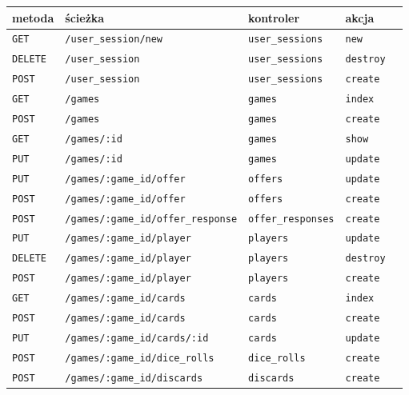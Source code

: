 \documentclass[a4paper,12pt]{article}
\begin{document}
\begin{table}[ht]
  \begin{tabular}{|l|l|l|l|l|}
    \hline
    \textbf{metoda} & \textbf{ścieżka} & \textbf{kontroler} & \textbf{akcja} \\ \hline
    \texttt{GET} & \texttt{/user\_session/new} & \texttt{user\_sessions} & \texttt{new} \\
    \texttt{DELETE} & \texttt{/user\_session} & \texttt{user\_sessions} & \texttt{destroy} \\
    \texttt{POST} & \texttt{/user\_session} & \texttt{user\_sessions} & \texttt{create} \\
    \texttt{GET} & \texttt{/games} & \texttt{games} & \texttt{index} \\
    \texttt{POST} & \texttt{/games} & \texttt{games} & \texttt{create} \\
    \texttt{GET} & \texttt{/games/:id} & \texttt{games} & \texttt{show} \\
    \texttt{PUT} & \texttt{/games/:id} & \texttt{games} & \texttt{update} \\
    \texttt{PUT} & \texttt{/games/:game\_id/offer} & \texttt{offers} & \texttt{update} \\
    \texttt{POST} & \texttt{/games/:game\_id/offer} & \texttt{offers} & \texttt{create} \\
    \texttt{POST} & \texttt{/games/:game\_id/offer\_response} & \texttt{offer\_responses} & \texttt{create} \\
    \texttt{PUT} & \texttt{/games/:game\_id/player} & \texttt{players} & \texttt{update} \\
    \texttt{DELETE} & \texttt{/games/:game\_id/player} & \texttt{players} & \texttt{destroy} \\
    \texttt{POST} & \texttt{/games/:game\_id/player} & \texttt{players} & \texttt{create} \\
    \texttt{GET} & \texttt{/games/:game\_id/cards} & \texttt{cards} & \texttt{index} \\
    \texttt{POST} & \texttt{/games/:game\_id/cards} & \texttt{cards} & \texttt{create} \\
    \texttt{PUT} & \texttt{/games/:game\_id/cards/:id} & \texttt{cards} & \texttt{update} \\
    \texttt{POST} & \texttt{/games/:game\_id/dice\_rolls} & \texttt{dice\_rolls} & \texttt{create} \\
    \texttt{POST} & \texttt{/games/:game\_id/discards} & \texttt{discards} & \texttt{create} \\

\end{tabular}
\end{table}
\end{document}
